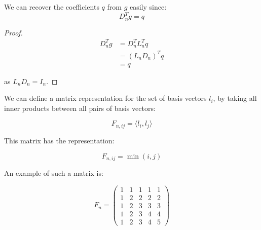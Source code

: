 \begin{proposition}
We can recover the coefficients \(q\) from \(g\) easily since:
\begin{equation}
D_n^Tg = q
\end{equation}
\label{def:a}
\end{proposition}
\begin{proof}

\begin{align}
D_n^Tg &= D_n^T L_n^T q \\
&= \left(L_nD_n\right)^Tq \\
&= q
\end{align}

as \(L_nD_n = I_n\).

\end{proof}


\begin{definition}
We can define a matrix representation for the set of basis vectors \(l_i\), by taking all inner products between all pairs of basis vectors:

\begin{equation}
F_{n, ij} = \langle l_i, l_j \rangle
\end{equation}

This matrix has the representation:

\begin{equation}
F_{n, ij} = \min(i,j)
\end{equation}

An example of such a matrix is:

\begin{equation}
F_n= \begin{pmatrix}
 1 & 1 & 1 & 1  & 1 \\
  1 & 2 & 2 & 2  & 2\\
     1 & 2 & 3 & 3  & 3  \\
    1 & 2 & 3 & 4  & 4  \\
     1 & 2 & 3 & 4  & 5 
\end{pmatrix}
\label{def:Fmtx}
\end{equation}
\end{definition}

